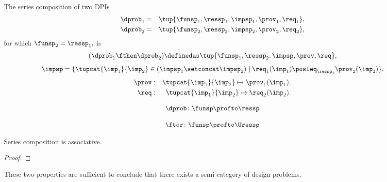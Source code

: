 \begin{definition}
  \label{def:series-composition}The series composition of two DPIs
  \begin{equation}
    \begin{aligned}
    \dprob_{1}&=&\tup{\funsp_{1},\ressp_{1},\impsp_{1},\prov_{1},\req_{1}},
  \\
    \dprob_{2}&=&\tup{\funsp_{2},\ressp_{2},\impsp_{2},\prov_{2},\req_{2}},
  \end{aligned}
  \end{equation}
  for which $\funsp_{2}=\ressp_{1},$ is
  \begin{equation}
    (\dprob_{1} \fthen \dprob_{2})
    \definedas
    \tup{ \funsp_{1},\ressp_{2},\impsp,\prov,\req},
  \end{equation}
  \begin{equation}
    \impsp  =  \{  \tupcat {\imp_{1}} {\imp_{2}} \in (\impsp_{1} \setconcat \impsp_{2})\mid\req_{1}(\imp_{1})\posleq_{\ressp_{1}}\prov_{2}(\imp_{2})\},
  \end{equation}
  \begin{equation}
  \begin{aligned}
    \prov & : & \tupcat {\imp_{1}} {\imp_{2}}   \mapsto\prov_{1}(\imp_{1}),\\
    \req & : & \tupcat {\imp_{1}} {\imp_{2}} \mapsto\req_{2}(\imp_{2}).
  \end{aligned}
  \end{equation}
\end{definition}

\begin{slides}
\begin{equation}\label{eq:dproba}
  \dprob \colon \funsp \profto \ressp
\end{equation}

\begin{equation}\label{eq:dprob2}
  \ftor \colon \funsp \profto \Uressp
\end{equation}
\end{slides}

\begin{lemma}
  Series composition is associative.
\end{lemma}              
\begin{proof}
\end{proof}

These two properties are sufficient to conclude that there exists a semi-category of design problems.

